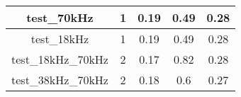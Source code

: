 \begin{longtable}{|c|c|c|c|c|}
test\_70kHz                                       & 1                                                                                              & 0.19                                    & 0.49                                 & 0.28                                    \\ \hline
test\_18kHz                                       & 1                                                                                              & 0.19                                    & 0.49                                 & 0.28                                    \\ \hline
test\_18kHz\_70kHz                                & 2                                                                                              & 0.17                                    & 0.82                                 & 0.28                                    \\ \hline
test\_38kHz\_70kHz                                & 2                                                                                              & 0.18                                    & 0.6                                  & 0.27                                    \\ \hline
\end{longtable}